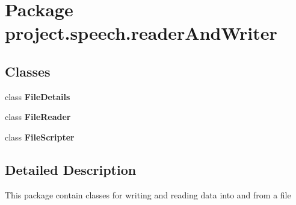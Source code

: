 \section{Package project.\+speech.\+reader\+And\+Writer}
\label{namespaceproject_1_1speech_1_1reader_and_writer}
\subsection*{Classes}
\begin{DoxyCompactItemize}
\item 
class {\bf File\+Details}
\item 
class {\bf File\+Reader}
\item 
class {\bf File\+Scripter}
\end{DoxyCompactItemize}


\subsection{Detailed Description}
This package contain classes for writing and reading data into and from a file 